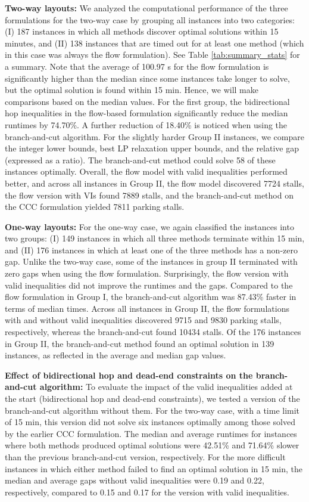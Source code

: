 \documentclass[10pt]{article}
\theoremstyle{definition}
\begin{document}
\textbf{Two-way layouts:} We analyzed the computational performance of the three formulations for the two-way case by grouping all instances into two categories: (I) 187 instances in which all methods discover optimal solutions within 15 minutes, and (II) 138 instances that are timed out for at least one method (which in this case was always the flow formulation). See Table \ref{tab:summary_stats} for a summary. Note that the average of 100.97 s for the flow formulation is significantly higher than the median since some instances take longer to solve, but the optimal solution is found within 15 min. Hence, we will make comparisons based on the median values. For the first group, the bidirectional hop inequalities in the flow-based formulation significantly reduce the median runtimes by 74.70\%. A further reduction of 18.40\% is noticed when using the branch-and-cut algorithm. For the slightly harder Group II instances, we compare the integer lower bounds, best LP relaxation upper bounds, and the relative gap (expressed as a ratio). The branch-and-cut method could solve 58 of these instances optimally. Overall, the flow model with valid inequalities performed better, and across all instances in Group II, the flow model discovered 7724 stalls, the flow version with VIs found 7889 stalls, and the branch-and-cut method on the CCC formulation yielded 7811 parking stalls.

\textbf{One-way layouts: }For the one-way case, we again classified the instances into two groups: (I) 149 instances in which all three methods terminate within 15 min, and (II) 176 instances in which at least one of the three methods has a non-zero gap. Unlike the two-way case, some of the instances in group II terminated with zero gaps when using the flow formulation. Surprisingly, the flow version with valid inequalities did not improve the runtimes and the gaps. Compared to the flow formulation in Group I, the branch-and-cut algorithm was 87.43\% faster in terms of median times. Across all instances in Group II, the flow formulations with and without valid inequalities discovered 9715 and 9830 parking stalls, respectively, whereas the branch-and-cut found 10434 stalls. Of the 176 instances in Group II, the branch-and-cut method found an optimal solution in 139 instances, as reflected in the average and median gap values.  

\textbf{Effect of bidirectional hop and dead-end constraints on the branch-and-cut algorithm:} To evaluate the impact of the valid inequalities added at the start (bidirectional hop and dead-end constraints), we tested a version of the branch-and-cut algorithm without them. For the two-way case, with a time limit of 15 min, this version did not solve six instances optimally among those solved by the earlier CCC formulation. The median and average runtimes for instances where both methods produced optimal solutions were 42.51\% and 71.64\% slower than the previous branch-and-cut version, respectively. For the more difficult instances in which either method failed to find an optimal solution in 15 min, the median and average gaps without valid inequalities were 0.19 and 0.22, respectively, compared to 0.15 and 0.17 for the version with valid inequalities. 
\end{document}
